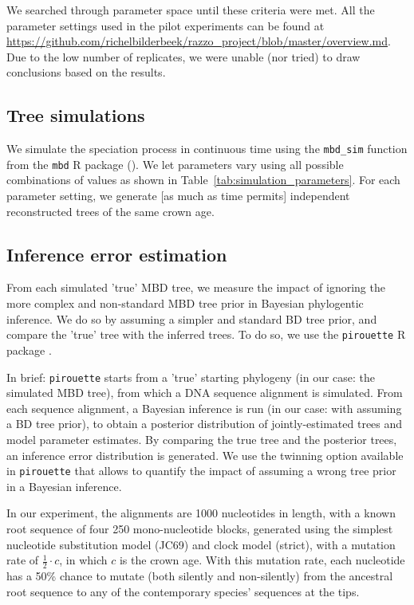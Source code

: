 We searched through parameter space until these criteria were met.
All the parameter settings used in the pilot experiments can be found at 
\url{https://github.com/richelbilderbeek/razzo_project/blob/master/overview.md}.
Due to the low number of replicates, we were unable (nor tried)
to draw conclusions based on the results. 

\subsection{Tree simulations}

We simulate the speciation process in continuous time 
using the \verb;mbd_sim; function from the \verb;mbd; R package (\citep{mbd}).
We let parameters vary using all possible combinations of values 
as shown in Table~\ref{tab:simulation_parameters}.
For each parameter setting, 
we generate [as much as time permits] 
independent reconstructed trees of the same crown age.

\subsection{Inference error estimation}

From each simulated 'true' MBD tree, we measure the impact of
ignoring the more complex and non-standard MBD tree prior in
Bayesian phylogentic inference.
We do so by assuming a simpler and standard BD tree prior,
and compare the 'true' tree with the inferred trees.
To do so, we use the \verb;pirouette; R package \citep{pirouette}.

In brief: \verb;pirouette; starts from 
a 'true' starting phylogeny (in our case: the simulated MBD tree), 
from which a DNA sequence alignment is simulated. 
From each sequence alignment, a Bayesian 
inference is run (in our case: with assuming a BD tree prior), 
to obtain a posterior distribution of jointly-estimated trees and model parameter estimates.
By comparing the true tree and the posterior trees, 
an inference error distribution is generated.
We use the twinning option available in \verb;pirouette;
that allows to quantify the impact of assuming a wrong
tree prior in a Bayesian inference.

In our experiment, the alignments are 1000 nucleotides in length, 
with a known root sequence of four 250 mono-nucleotide blocks, 
generated using the simplest nucleotide substitution model (JC69) 
and clock model (strict), with a mutation rate of $\frac{1}{2}\cdot c$,
in which $c$ is the crown age. 
With this mutation rate, each nucleotide has a 50\% chance
to mutate (both silently and non-silently) from the ancestral root sequence 
to any of the contemporary species' sequences at the tips.


